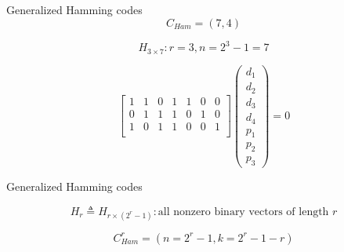 
\begin{frame}{Generalized Hamming codes}
  \[
	C_{Ham} = (7,4)
  \]

  \[
	H_{3 \times 7}: r = 3, n = 2^3 - 1 = 7
  \]

  \[
	\begin{bmatrix}
	  1 & 1 & 0 & 1 & 1 & 0 & 0 \\
	  0 & 1 & 1 & 1 & 0 & 1 & 0 \\
	  1 & 0 & 1 & 1 & 0 & 0 & 1 \\
	\end{bmatrix} \begin{pmatrix}
      d_1 \\ d_2 \\ d_3 \\ d_4 \\ p_1 \\ p_2 \\ p_3
	\end{pmatrix}
	= 0
  \]
\end{frame}

\begin{frame}{Generalized Hamming codes}
  \begin{definition}
	\[
	  H_r \triangleq H_{r \times (2^r-1)}: \text{all nonzero binary vectors of length } r
	\]

	\[
	  C_{Ham}^{r} = (n = 2^r-1, k = 2^r-1-r)
	\]
  \end{definition}
\end{frame}
